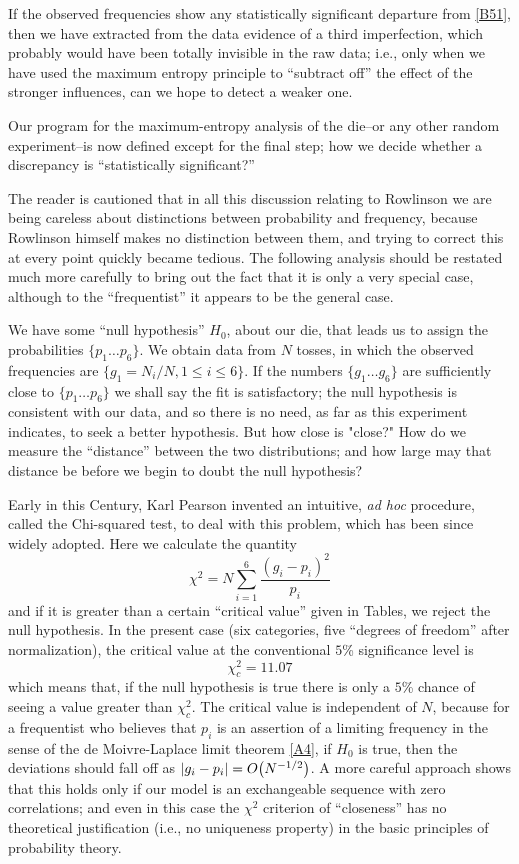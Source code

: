 If the observed frequencies show any statistically significant departure from \eqref{B51}, then we have extracted from the data evidence of a third imperfection, which probably would have been totally invisible in the raw data; i.e., only when we have used the maximum entropy principle to ``subtract off'' the effect of the stronger influences, can we hope to detect a weaker one.

Our program for the maximum-entropy analysis of the die--or any other random experiment--is now defined except for the final step; how we decide whether a discrepancy is ``statistically significant?''

The reader is cautioned that in all this discussion relating to Rowlinson we are being careless about distinctions between probability and frequency, because Rowlinson himself makes no distinction between them, and trying to correct this at every point quickly became tedious.
The following analysis should be restated much more carefully to bring out the fact that it is only a very special case, although to the ``frequentist'' it appears to be the general case.

We have some ``null hypothesis'' $H_0$, about our die, that leads us to assign the probabilities $\{p_1\ldots p_6\}$.
We obtain data from $N$ tosses, in which the observed frequencies are $\{g_1 = N_i/N, 1\leq i \leq6\}$.
If the numbers $\{g_1\ldots g_6\}$ are sufficiently close to $\{p_1\ldots p_6\}$ we shall say the fit is satisfactory; the null hypothesis is consistent with our data, and so there is no need, as far as this experiment indicates, to seek a better hypothesis.
But how close is "close?" How do we measure the ``distance'' between the two distributions; and how large may that distance be before we begin to doubt the null hypothesis?

Early in this Century, Karl Pearson invented an intuitive, \emph{ad hoc} procedure, called the Chi-squared test, to deal with this problem, which has been since widely adopted.
Here we calculate the quantity
\begin{equation}
	\label{B54}
	\chi^2 = N\sum_{i=1}^{6} \frac{(g_i - p_i)^2}{p_i}
\end{equation}
and if it is greater than a certain ``critical value'' given in Tables, we reject the null hypothesis.
In the present case (six categories, five ``degrees of freedom'' after normalization), the critical value at the conventional $5$\% significance level is
\begin{equation}
	\label{B55}
	\chi^2_c = 11.07
\end{equation}
which means that, if the null hypothesis is true there is only a $5$\% chance of seeing a value greater than $\chi^2_c$.
The critical value is independent of $N$, because for a frequentist who believes that $p_i$ is an assertion of a limiting frequency in the sense of the de Moivre-Laplace limit theorem \eqref{A4}, if $H_0$ is true, then the deviations should fall off as $\abs{g_i - p_i} = O\left(N^{-1/2}\right)$.
A more careful approach shows that this holds only if our model is an exchangeable sequence with zero correlations; and even in this case the $\chi^2$ criterion of ``closeness'' has no theoretical justification (i.e., no uniqueness property) in the basic principles of probability theory.

